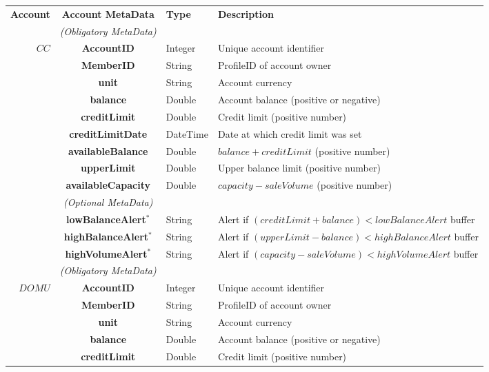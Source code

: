\begin{table}[H]
\begin{centering}
\small
{
\begin{tabular}{ r | c | l | l }
\hline
\textbf{Account}	& {\bf Account MetaData} & {\bf Type} & {\bf Description} \\
\Xhline{1.5pt}
			 & \emph{(Obligatory MetaData)}& & \\
\cline{2-2}
$CC$		& {\bf AccountID}			&Integer	& Unique account identifier \\
			& {\bf MemberID}			&String	& ProfileID of account owner \\
			& {\bf unit}					&String	& Account currency \\
			& {\bf balance}				&Double	& Account balance (positive or negative) \\
			& {\bf creditLimit}			&Double	& Credit limit (positive number) \\
			& {\bf creditLimitDate}		&DateTime & Date at which credit limit was set \\
			& {\bf availableBalance}		&Double	& $balance + creditLimit$ (positive number) \\
			& {\bf upperLimit}			&Double	& Upper balance limit (positive number) \\
			& {\bf availableCapacity}		&Double	& $capacity - saleVolume$ (positive number) \\
\cline{2-2}
			 & \emph{(Optional MetaData)}& & \\
\cline{2-2}
			& {\bf lowBalanceAlert$^*$}		&String	& Alert if $(creditLimit + balance) < lowBalanceAlert$ buffer \\
			& {\bf highBalanceAlert$^*$}		&String	& Alert if $(upperLimit - balance) < highBalanceAlert$ buffer \\
			& {\bf highVolumeAlert$^*$}		&String	& Alert if $(capacity - saleVolume) < highVolumeAlert$ buffer \\
\Xhline{1.5pt}
			 & \emph{(Obligatory MetaData)}& & \\
\cline{2-2}
$DOMU$		& {\bf AccountID}			&Integer	& Unique account identifier \\
			& {\bf MemberID}			&String	& ProfileID of account owner \\
			& {\bf unit}					&String	& Account currency \\
			& {\bf balance}				&Double	& Account balance (positive or negative) \\
			& {\bf creditLimit}			&Double	& Credit limit (positive number) \\

\end{tabular}}
\end{centering}
\end{table}
